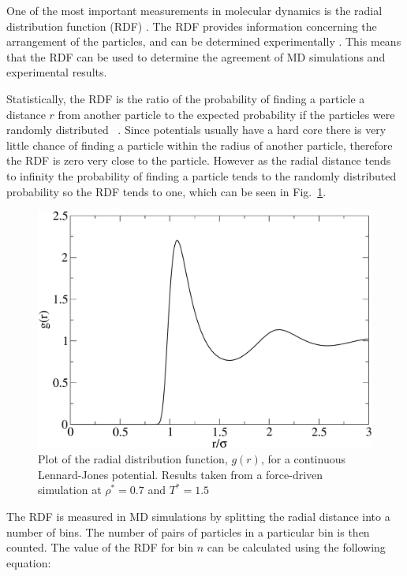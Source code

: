 \documentclass[12pt]{UoAthesis}
\begin{document}
One of the most important measurements in molecular dynamics is the
radial distribution function (RDF) . The RDF provides information concerning the
arrangement of the particles, and can be determined experimentally
\cite{Yarnell1973}. This means that the RDF can be used to determine
the agreement of MD simulations and experimental results.

Statistically, the RDF is the ratio of the probability of finding a
particle a distance $r$ from another particle to the expected
probability if the particles were randomly distributed
~\cite{Allen1987}. Since potentials usually have a hard core there is
very little chance of finding a particle within the radius of another
particle, therefore the RDF is zero very close to the particle.
However as the radial distance tends to infinity the probability of
finding a particle tends to the randomly distributed probability so
the RDF tends to one, which can be seen in Fig.~\ref{fig:rdfsmooth}.

\begin{figure}[htp] 
  \begin{center}
    \includegraphics[clip,width=\textwidth]{figures/rdfsmooth} 
    \caption{\label{fig:rdfsmooth} Plot of the radial distribution
      function, $g(r)$, for a continuous Lennard-Jones
      potential. Results taken from a force-driven simulation at
      $\rho^*=0.7$ and $T^*=1.5$}
  \end{center}
\end{figure}

The RDF is measured in MD simulations by splitting the radial distance
into a number of bins.  The number of pairs of particles in a
particular bin is then counted.  The value of the RDF for bin $n$ can
be calculated using the following equation:
\end{document}
